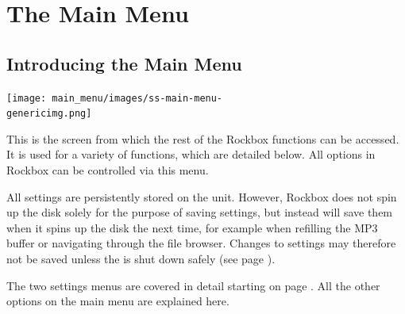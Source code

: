 \chapter{The Main Menu}

\section{Introducing the Main Menu}
\begin{center}
  \texttt{[image: main\_menu/images/ss-main-menu-\\genericimg.png]}
\end{center}
This is the screen from which the rest of the Rockbox functions can be accessed.  It is used for a variety of functions, which are detailed below. All options in Rockbox can be controlled via this menu.

All settings are persistently stored on the unit. However, Rockbox does not spin up the disk solely for the purpose of saving settings, but instead will save them when it spins up the disk the next time, for example when refilling the MP3 buffer or navigating through the file browser. Changes to settings may therefore not be saved unless the \dap is shut down safely (see page \pageref{ref:Safeshutdown}).

The two settings menus are covered in detail starting on page \pageref{ref:configure_rockbox}. All the other options on the main menu are explained here.

